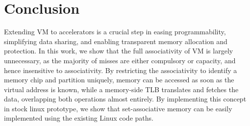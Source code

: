 \section{Conclusion}
\label{sec:conclusion}

Extending VM to accelerators is a crucial step in easing programmability, simplifying data sharing, and enabling transparent memory allocation and protection. In this work, we show that the full associativity of VM is largely unnecessary, as the majority of misses are either compulsory or capacity, and hence insensitive to associativity. By restricting the associativity to identify a memory chip and partition uniquely, memory can be accessed as soon as the virtual address is known, while a memory-side TLB translates and fetches the data, overlapping both operations almost entirely. By implementing this concept in stock linux prototype, we show that set-associative memory can be easily implemented using the existing Linux code paths. 




\newpage
